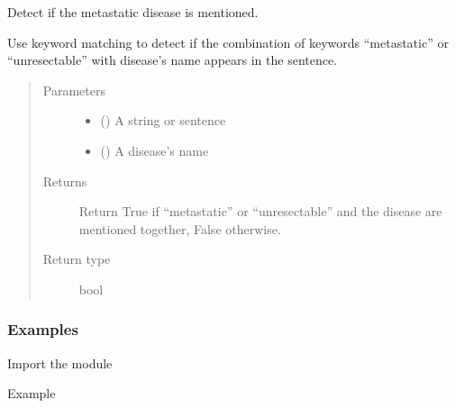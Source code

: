 \documentclass[letterpaper,10pt,english]{sphinxmanual}
\begin{document}
\begin{fulllineitems}
\label{\detokenize{biomarker_extraction:biomarker_extraction.is_metastatic}}
\sphinxAtStartPar
Detect if the metastatic disease is mentioned.

\sphinxAtStartPar
Use keyword matching to detect if the combination of keywords “metastatic” or “unresectable” with disease’s name appears in the sentence.
\begin{quote}\begin{description}
\item[{Parameters}] \leavevmode\begin{itemize}
\item {} 
\sphinxAtStartPar
{} () \textendash{} A string or sentence

\item {} 
\sphinxAtStartPar
{} () \textendash{} A disease’s name

\end{itemize}

\item[{Returns}] \leavevmode
\sphinxAtStartPar
Return True if “metastatic” or “unresectable” and the disease are mentioned together, False otherwise.

\item[{Return type}] \leavevmode
\sphinxAtStartPar
bool

\end{description}\end{quote}
\subsubsection*{Examples}

\sphinxAtStartPar
Import the module

\begin{sphinxVerbatim}[commandchars=\\\{\}]
   
\end{sphinxVerbatim}

\sphinxAtStartPar
Example


\end{fulllineitems}
\end{document}
